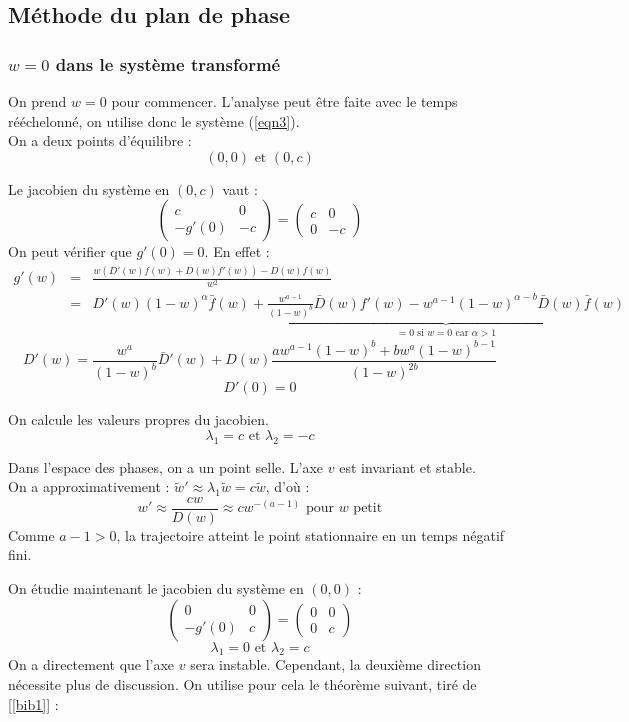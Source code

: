 \documentclass{article}
\begin{document}
\subsection{Méthode du plan de phase}
\subsubsection{$w=0$ dans le système transformé}

On prend $w=0$ pour commencer. L'analyse peut être faite avec le temps rééchelonné, on utilise donc le système (\ref{eqn3}).\\ 
On a deux points d'équilibre : \[(0,0) \text{ et } (0,c)\]

Le jacobien du système en $(0,c)$ vaut : \[\begin{pmatrix} c & 0 \\ -g'(0) & -c \end{pmatrix} = \begin{pmatrix} c & 0 \\ 0 & -c \end{pmatrix}\]
On peut vérifier que $g'(0)=0$. En effet :
\begin{eqnarray*}
g'(w)&=&\frac{w(D'(w)f(w)+D(w)f'(w))-D(w)f(w)}{w^2}\\
	&=&D'(w)(1-w)^\alpha\bar{f}(w)+\underbrace{\frac{w^{a-1}}{(1-w)^b}\bar{D}(w)f'(w)-w^{a-1}(1-w)^{\alpha-b}\bar{D}(w)\bar{f}(w)}_{=0 \text{ si } w=0 \text{ car } \alpha>1}
\end{eqnarray*}
\[D'(w)=\frac{w^a}{(1-w)^b}\bar{D}'(w)+D(w)\frac{aw^{a-1}(1-w)^b+bw^a(1-w)^{b-1}}{(1-w)^{2b}}\]
\[D'(0)=0\]

On calcule les valeurs propres du jacobien.
\[\lambda_1=c \text{ et } \lambda_2=-c\]

Dans l'espace des phases, on a un point selle. L'axe $v$ est invariant et stable. \\
On a approximativement : $\tilde{w}'\approx \lambda_1 \tilde{w} = c\tilde{w}$, d'où : 
\[w'\approx \frac{cw}{D(w)} \approx cw^{-(a-1)} \text{ pour } w \text{ petit}\]
Comme $a-1>0$, la trajectoire atteint le point stationnaire en un temps négatif fini.

\bigskip
On étudie maintenant le jacobien du système en $(0,0)$ : \[\begin{pmatrix} 0 & 0 \\ -g'(0) & c \end{pmatrix} = \begin{pmatrix} 0 & 0 \\ 0 & c \end{pmatrix}\]
\[\lambda_1=0 \text{ et } \lambda_2=c\]
On a directement que l'axe $v$ sera instable. Cependant, la deuxième direction nécessite plus de discussion. On utilise pour cela le théorème suivant, tiré de [\ref{bib1}] :
\end{document}
